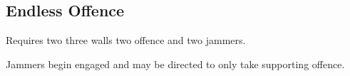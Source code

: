 \subsection*{Endless Offence}

Requires two three walls two offence and two jammers. 

Jammers begin engaged and may be directed to only take supporting offence. 

